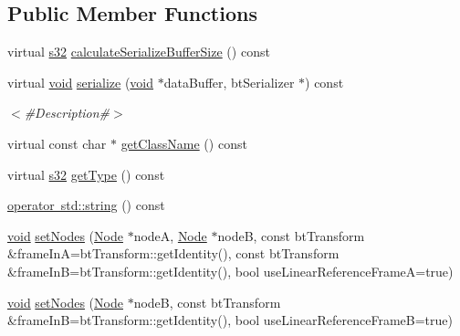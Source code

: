 \subsection*{Public Member Functions}
\begin{DoxyCompactItemize}
\item 
virtual \mbox{\hyperlink{_util_8h_aa62c75d314a0d1f37f79c4b73b2292e2}{s32}} \mbox{\hyperlink{classnjli_1_1_physics_constraint_generic6_dof_a386006d689e37b554d43d86d718966d8}{calculate\+Serialize\+Buffer\+Size}} () const
\item 
virtual \mbox{\hyperlink{_thread_8h_af1e856da2e658414cb2456cb6f7ebc66}{void}} \mbox{\hyperlink{classnjli_1_1_physics_constraint_generic6_dof_adebf86567407706023e5800b59308635}{serialize}} (\mbox{\hyperlink{_thread_8h_af1e856da2e658414cb2456cb6f7ebc66}{void}} $\ast$data\+Buffer, bt\+Serializer $\ast$) const
\begin{DoxyCompactList}\small\item\em $<$\#\+Description\#$>$ \end{DoxyCompactList}\item 
virtual const char $\ast$ \mbox{\hyperlink{classnjli_1_1_physics_constraint_generic6_dof_a29b23a079a5d93600a701d7635fb26cd}{get\+Class\+Name}} () const
\item 
virtual \mbox{\hyperlink{_util_8h_aa62c75d314a0d1f37f79c4b73b2292e2}{s32}} \mbox{\hyperlink{classnjli_1_1_physics_constraint_generic6_dof_aa3004e4d926ca03e19209b5ee79817d9}{get\+Type}} () const
\item 
\mbox{\hyperlink{classnjli_1_1_physics_constraint_generic6_dof_a8989bd7a2e05a4abf8edcaa7468648f6}{operator std\+::string}} () const
\item 
\mbox{\hyperlink{_thread_8h_af1e856da2e658414cb2456cb6f7ebc66}{void}} \mbox{\hyperlink{classnjli_1_1_physics_constraint_generic6_dof_a906e4dd9d37dfce908cbae90e58f3dbf}{set\+Nodes}} (\mbox{\hyperlink{classnjli_1_1_node}{Node}} $\ast$nodeA, \mbox{\hyperlink{classnjli_1_1_node}{Node}} $\ast$nodeB, const bt\+Transform \&frame\+InA=bt\+Transform\+::get\+Identity(), const bt\+Transform \&frame\+InB=bt\+Transform\+::get\+Identity(), bool use\+Linear\+Reference\+FrameA=true)
\item 
\mbox{\hyperlink{_thread_8h_af1e856da2e658414cb2456cb6f7ebc66}{void}} \mbox{\hyperlink{classnjli_1_1_physics_constraint_generic6_dof_a52d5136abf9b7cac2d0ad0200745d30d}{set\+Nodes}} (\mbox{\hyperlink{classnjli_1_1_node}{Node}} $\ast$nodeB, const bt\+Transform \&frame\+InB=bt\+Transform\+::get\+Identity(), bool use\+Linear\+Reference\+FrameB=true)

\end{DoxyCompactItemize}
